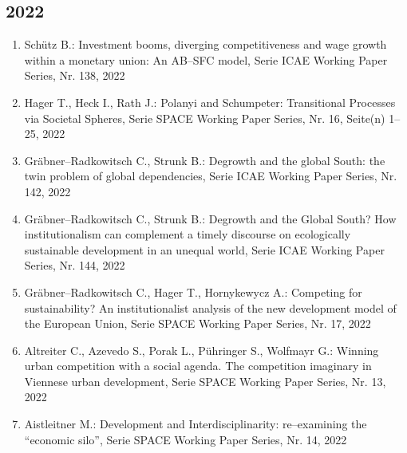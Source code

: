 \subsection*{2022}
\begin{enumerate}
    	 \item Schütz B.: Investment booms, diverging competitiveness and wage growth within a monetary union: An AB--SFC model, Serie ICAE Working Paper Series, Nr. 138, 2022
	 \item Hager T., Heck I., Rath J.: Polanyi and Schumpeter: Transitional Processes via Societal Spheres, Serie SPACE Working Paper Series, Nr. 16, Seite(n) 1--25, 2022
	 \item Gräbner--Radkowitsch C., Strunk B.: Degrowth and the global South: the twin problem of global dependencies, Serie ICAE Working Paper Series, Nr. 142, 2022
	 \item Gräbner--Radkowitsch C., Strunk B.: Degrowth and the Global South? How institutionalism can complement a timely discourse on ecologically sustainable development in an unequal world, Serie ICAE Working Paper Series, Nr. 144, 2022
	 \item Gräbner--Radkowitsch C., Hager T., Hornykewycz A.: Competing for sustainability? An institutionalist analysis of the new development model of the European Union, Serie SPACE Working Paper Series, Nr. 17, 2022
	 \item Altreiter C., Azevedo S., Porak L., Pühringer S., Wolfmayr G.: Winning urban competition with a social agenda. The competition imaginary in Viennese urban development, Serie SPACE Working Paper Series, Nr. 13, 2022
	 \item Aistleitner M.: Development and Interdisciplinarity: re--examining the “economic silo”, Serie SPACE Working Paper Series, Nr. 14, 2022
\end{enumerate}
